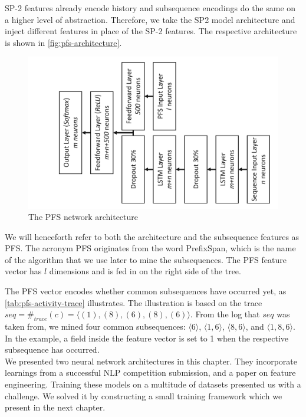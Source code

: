 SP-2 features already encode history and subsequence encodings do the same on a higher level of abstraction.
Therefore, we take the SP2 model architecture and inject different features in place of the SP-2 features.
The respective architecture is shown in \autoref{fig:pfs-architecture}.

\begin{figure}
    \centering
    \includegraphics[width=.8\textwidth,angle=-90,origin=c]{gfx/pfs-network-architecture.pdf}
    \caption{The PFS network architecture}
    \label{fig:pfs-architecture}
\end{figure}

We will henceforth refer to both the architecture and the subsequence features as PFS.
The acronym PFS originates from the word PrefixSpan, which is the name of the algorithm that we use later to mine the subsequences.
The PFS feature vector has $l$ dimensions and is fed in on the right side of the tree.

The PFS vector encodes whether common subsequences have occurred yet, as \autoref{tab:pfs-activity-trace} illustrates.
The illustration is based on the trace $seq=\#_{trace}(c)=\langle (1), (8), (6), (8), (6)\rangle$.
From the log that $seq$ was taken from, we mined four common subsequences: $\langle 6\rangle$, $\langle 1,6\rangle$, $\langle 8,6\rangle$, and $\langle1,8,6\rangle$.
In the example, a field inside the feature vector is set to 1 when the respective subsequence has occurred.\\

We presented two neural network architectures in this chapter. They incorporate
learnings from a successful NLP competition submission, and a paper on feature engineering.
Training these models on a multitude of datasets presented us with a challenge.
We solved it by constructing a small training framework which we present in the next chapter.

